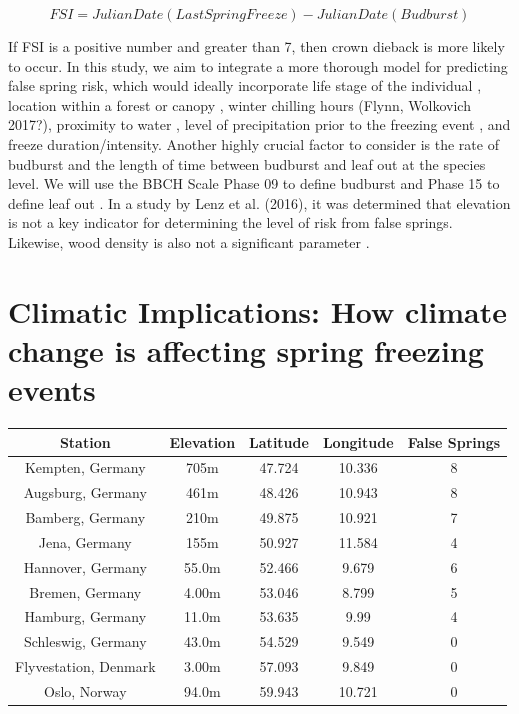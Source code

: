 \documentclass{article}\usepackage[]{graphicx}\usepackage[]{color}
\begin{document}
\[ FSI = Julian Date (Last Spring Freeze) - Julian Date (Budburst) \]

If FSI is a positive number and greater than 7, then crown dieback is more likely to occur. In this study, we aim to integrate a more thorough model for predicting false spring risk, which would ideally incorporate life stage of the individual \citep{Caffarra2011}, location within a forest or canopy \citep{Augspurger2013, Augspurger2009}, winter chilling hours (Flynn, Wolkovich 2017?), proximity to water \citep{Gu2008}, level of precipitation prior to the freezing event \citep{Anderegg2013}, and freeze duration/intensity. Another highly crucial factor to consider is the rate of budburst and the length of time between budburst and leaf out at the species level. We will use the BBCH Scale Phase 09 to define budburst and Phase 15 to define leaf out \citep{Meier2001}. In a study by Lenz et al. (2016), it was determined that elevation is not a key indicator for determining the level of risk from false springs. Likewise, wood density is also not a significant parameter \citep{Augspurger2009}.

\section{Climatic Implications: How climate change is affecting spring freezing events}
\begin{center}
 \label{tab:title} 
\begin{tabular}{|c|c|c|c|c|}
\hline
Station & Elevation & Latitude & Longitude & False Springs \\
\hline
Kempten, Germany & 705m & 47.724 & 10.336 & 8 \\
Augsburg, Germany & 461m & 48.426 & 10.943 & 8 \\
Bamberg, Germany & 210m & 49.875 & 10.921 & 7 \\
Jena, Germany & 155m & 50.927 & 11.584 & 4 \\
Hannover, Germany & 55.0m & 52.466 & 9.679 & 6 \\
Bremen, Germany & 4.00m & 53.046 & 8.799 & 5 \\
Hamburg, Germany & 11.0m & 53.635 & 9.99 & 4 \\
Schleswig, Germany & 43.0m & 54.529 & 9.549 & 0 \\
Flyvestation, Denmark & 3.00m & 57.093 & 9.849 & 0 \\
Oslo, Norway & 94.0m & 59.943 & 10.721 & 0 \\
\hline
\end{tabular}
\end{center}
\end{document}
